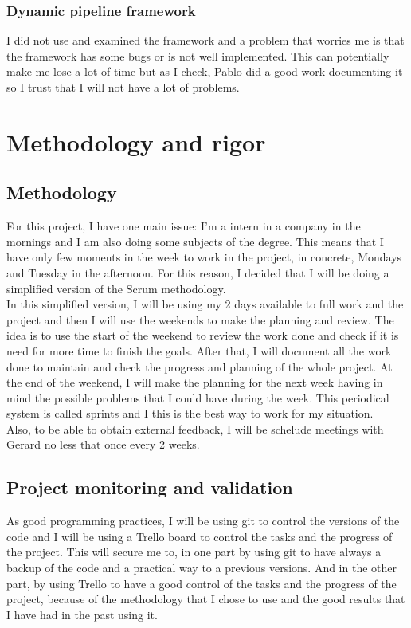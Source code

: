 \subsection{Dynamic pipeline framework}
I did not use and examined the framework and a problem that worries me is that the framework has some bugs or is not well implemented.
This can potentially make me lose a lot of time but as I check, Pablo did a good work documenting it so I trust that I will not have a lot of problems.

\chapter{Methodology and rigor}
\section{Methodology}
For this project, I have one main issue: I'm a intern in a company in the mornings and I am also doing some subjects of the degree.
This means that I have only few moments in the week to work in the project, in concrete, Mondays and Tuesday in the afternoon.
For this reason, I decided that I will be doing a simplified version of the Scrum methodology.\cite{Scrum}\\

In this simplified version, I will be using my 2 days available to full work and the project and then I will use the weekends to make the planning and review.
The idea is to use the start of the weekend to review the work done and check if it is need for more time to finish the goals.
After that, I will document all the work done to maintain and check the progress and planning of the whole project. 
At the end of the weekend, I will make the planning for the next week having in mind the possible problems that I could have during the week.
This periodical system is called sprints and I this is the best way to work for my situation.\\

Also, to be able to obtain external feedback, I will be schelude meetings with Gerard no less that once every 2 weeks.
\section{Project monitoring and validation}
As good programming practices, I will be using git \cite{Git} to control the versions of the code and I will be using a Trello board to control the tasks and the progress of the project.
This will secure me to, in one part by using git to have always a backup of the code and a practical way to a previous versions.
And in the other part, by using Trello to have a good control of the tasks and the progress of the project, because of the methodology that I chose to use and the good results that I have had in the past using it.



